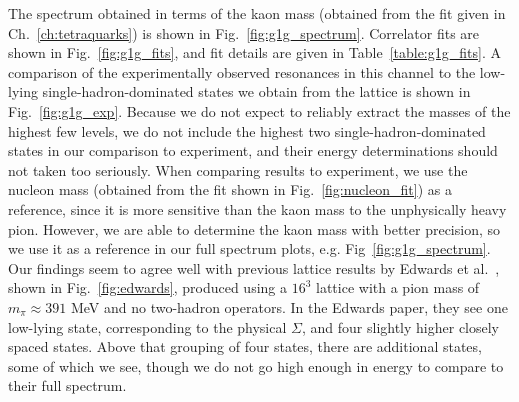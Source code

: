 The spectrum obtained in terms of the kaon mass (obtained from the fit given in Ch.~\ref{ch:tetraquarks}) is shown in Fig.~\ref{fig:g1g_spectrum}. Correlator fits are shown in Fig.~\ref{fig:g1g_fits}, and fit details are given in Table~\ref{table:g1g_fits}. A comparison of the experimentally observed resonances in this channel to the low-lying single-hadron-dominated states we obtain from the lattice is shown in Fig.~\ref{fig:g1g_exp}. Because we do not expect to reliably extract the masses of the highest few levels, we do not include the highest two single-hadron-dominated states in our comparison to experiment, and their energy determinations should not taken too seriously. When comparing results to experiment, we use the nucleon mass (obtained from the fit shown in Fig.~\ref{fig:nucleon_fit}) as a reference, since it is more sensitive than the kaon mass to the unphysically heavy pion. However, we are able to determine the kaon mass with better precision, so we use it as a reference in our full spectrum plots, e.g. Fig~\ref{fig:g1g_spectrum}. Our findings seem to agree well with previous lattice results by Edwards et al.~\cite{Edwards:2012fx}, shown in Fig.~\ref{fig:edwards}, produced using a $16^3$ lattice with a pion mass of $m_\pi \approx 391$ MeV and no two-hadron operators. In the Edwards paper, they see one low-lying state, corresponding to the physical $\Sigma$, and four slightly higher closely spaced states. Above that grouping of four states, there are additional states, some of which we see, though we do not go high enough in energy to compare to their full spectrum.

